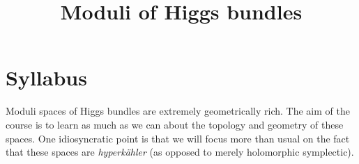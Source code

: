 \documentclass[12pt,letterpaper,reqno]{amsart}
\numberwithin{equation}{section}
\newcommand{\hk}{hyperk\"ahler\xspace}
\newcommand{\ti}[1]{\textit{#1}}
\begin{document}
\title{Moduli of Higgs bundles}
\date{}

\maketitle

\setcounter{page}{1}

\section{Syllabus}

Moduli spaces of Higgs bundles are extremely 
geometrically rich.
The aim of the course is to learn as much as we can about 
the topology and geometry of these spaces. One 
idiosyncratic point is that we will focus more than 
usual on the fact that these spaces are \ti{\hk} 
(as opposed to merely holomorphic symplectic).
\end{document}
